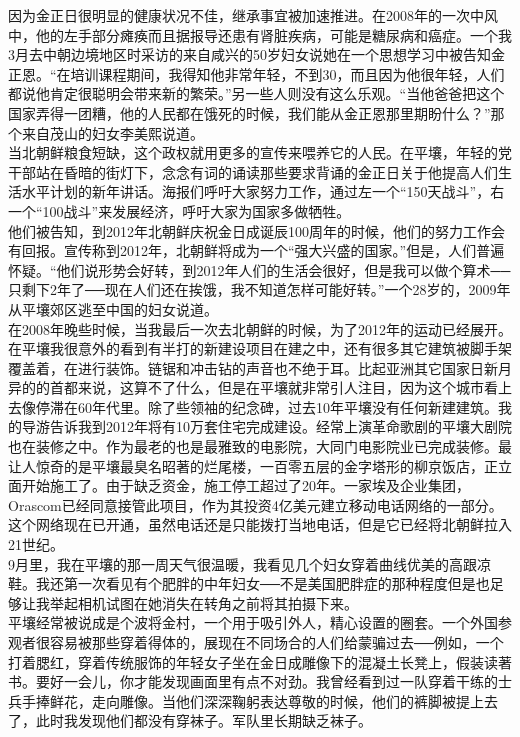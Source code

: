 因为金正日很明显的健康状况不佳，继承事宜被加速推进。在2008年的一次中风中，他的左手部分瘫痪而且据报导还患有肾脏疾病，可能是糖尿病和癌症。一个我3月去中朝边境地区时采访的来自咸兴的50岁妇女说她在一个思想学习中被告知金正恩。“在培训课程期间，我得知他非常年轻，不到30，而且因为他很年轻，人们都说他肯定很聪明会带来新的繁荣。”另一些人则没有这么乐观。“当他爸爸把这个国家弄得一团糟，他的人民都在饿死的时候，我们能从金正恩那里期盼什么？”那个来自茂山的妇女李美熙说道。\\

当北朝鲜粮食短缺，这个政权就用更多的宣传来喂养它的人民。在平壤，年轻的党干部站在昏暗的街灯下，念念有词的诵读那些要求背诵的金正日关于他提高人们生活水平计划的新年讲话。海报们呼吁大家努力工作，通过左一个“150天战斗”，右一个“100战斗”来发展经济，呼吁大家为国家多做牺牲。\\

他们被告知，到2012年北朝鲜庆祝金日成诞辰100周年的时候，他们的努力工作会有回报。宣传称到2012年，北朝鲜将成为一个“强大兴盛的国家。”但是，人们普遍怀疑。“他们说形势会好转，到2012年人们的生活会很好，但是我可以做个算术──只剩下2年了──现在人们还在挨饿，我不知道怎样可能好转。”一个28岁的，2009年从平壤郊区逃至中国的妇女说道。\\

在2008年晚些时候，当我最后一次去北朝鲜的时候，为了2012年的运动已经展开。在平壤我很意外的看到有半打的新建设项目在建之中，还有很多其它建筑被脚手架覆盖着，在进行装饰。链锯和冲击钻的声音也不绝于耳。比起亚洲其它国家日新月异的的首都来说，这算不了什么，但是在平壤就非常引人注目，因为这个城市看上去像停滞在60年代里。除了些领袖的纪念碑，过去10年平壤没有任何新建建筑。我的导游告诉我到2012年将有10万套住宅完成建设。经常上演革命歌剧的平壤大剧院也在装修之中。作为最老的也是最雅致的电影院，大同门电影院业已完成装修。最让人惊奇的是平壤最臭名昭著的烂尾楼，一百零五层的金字塔形的柳京饭店，正立面开始施工了。由于缺乏资金，施工停工超过了20年。一家埃及企业集团，Orascom已经同意接管此项目，作为其投资4亿美元建立移动电话网络的一部分。这个网络现在已开通，虽然电话还是只能拨打当地电话，但是它已经将北朝鲜拉入21世纪。\\

9月里，我在平壤的那一周天气很温暖，我看见几个妇女穿着曲线优美的高跟凉鞋。我还第一次看见有个肥胖的中年妇女──不是美国肥胖症的那种程度但是也足够让我举起相机试图在她消失在转角之前将其拍摄下来。\\

平壤经常被说成是个波将金村，一个用于吸引外人，精心设置的圈套。一个外国参观者很容易被那些穿着得体的，展现在不同场合的人们给蒙骗过去──例如，一个打着腮红，穿着传统服饰的年轻女子坐在金日成雕像下的混凝土长凳上，假装读著书。要好一会儿，你才能发现画面里有点不对劲。我曾经看到过一队穿着干练的士兵手捧鲜花，走向雕像。当他们深深鞠躬表达尊敬的时候，他们的裤脚被提上去了，此时我发现他们都没有穿袜子。军队里长期缺乏袜子。\\

